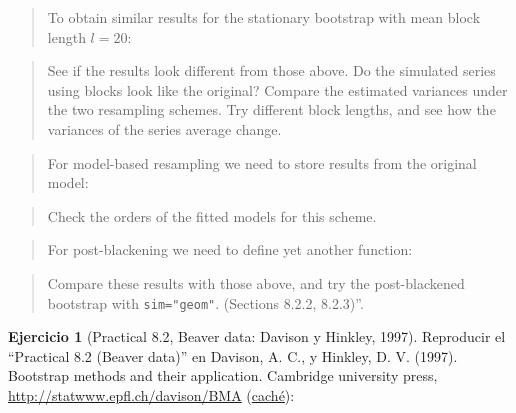\documentclass[
]{book}
\newenvironment{Shaded}{\begin{snugshade}}{\end{snugshade}}
\newcommand{\CommentTok}[1]{\textcolor[rgb]{0.56,0.35,0.01}{\textit{#1}}}
\newcommand{\FloatTok}[1]{\textcolor[rgb]{0.00,0.00,0.81}{#1}}
\newcommand{\KeywordTok}[1]{\textcolor[rgb]{0.13,0.29,0.53}{\textbf{#1}}}
\newcommand{\NormalTok}[1]{#1}
\newcommand{\OperatorTok}[1]{\textcolor[rgb]{0.81,0.36,0.00}{\textbf{#1}}}
\newcommand{\StringTok}[1]{\textcolor[rgb]{0.31,0.60,0.02}{#1}}
\theoremstyle{break}
\theoremstyle{definition}
\theoremstyle{definition}
\theoremstyle{definition}
\newtheorem{exercise}{Ejercicio}[chapter]
\theoremstyle{remark}
\begin{document}
\begin{quote}
To obtain similar results for the stationary
bootstrap with mean block length \(l = 20\):
\end{quote}

\begin{Shaded}
\end{Shaded}

\begin{quote}
See if the results look different from those above.
Do the simulated series using blocks look like the original?
Compare the estimated variances under the two resampling schemes.
Try different block lengths, and see how
the variances of the series average change.
\end{quote}

\begin{quote}
For model-based resampling we need to store results from the original model:
\end{quote}

\begin{quote}
Check the orders of the fitted models for this scheme.
\end{quote}

\begin{quote}
For post-blackening we need to define yet another function:
\end{quote}

\begin{quote}
Compare these results with those above, and try the post-blackened bootstrap with \texttt{sim="geom"}.
(Sections 8.2.2, 8.2.3)''.
\end{quote}

\begin{exercise}[Practical 8.2, Beaver data: Davison y Hinkley, 1997]
\protect\hypertarget{exr:tsboot-beaver}{}{\label{exr:tsboot-beaver} \iffalse (Practical 8.2, Beaver data: Davison y Hinkley, 1997) \fi{} }
Reproducir el ``Practical 8.2 (Beaver data)'' en Davison, A. C., y Hinkley, D. V. (1997). Bootstrap methods and their application. Cambridge university press, \url{http://statwww.epfl.ch/davison/BMA}
(\href{http://webcache.googleusercontent.com/search?q=cache:a4nFL5ymMMoJ:statwww.epfl.ch/davison/BMA/+\&cd=1\&hl=gl\&ct=clnk\&gl=es}{caché}):
\end{exercise}
\end{document}

